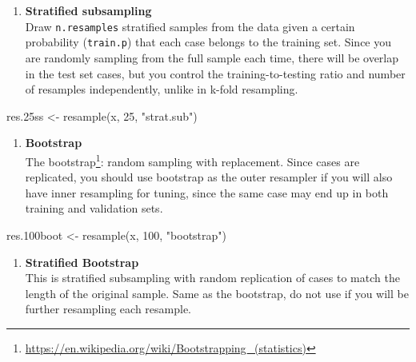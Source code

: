 \documentclass[
]{book}
\newenvironment{Shaded}{\begin{snugshade}}{\end{snugshade}}
\newcommand{\DecValTok}[1]{\textcolor[rgb]{0.00,0.00,0.81}{#1}}
\newcommand{\FloatTok}[1]{\textcolor[rgb]{0.00,0.00,0.81}{#1}}
\newcommand{\FunctionTok}[1]{\textcolor[rgb]{0.00,0.00,0.00}{#1}}
\newcommand{\NormalTok}[1]{#1}
\newcommand{\OtherTok}[1]{\textcolor[rgb]{0.56,0.35,0.01}{#1}}
\newcommand{\StringTok}[1]{\textcolor[rgb]{0.31,0.60,0.02}{#1}}
\DeclareRobustCommand{\href}[2]{#2\footnote{\url{#1}}}
\providecommand{\tightlist}{%
  \setlength{\itemsep}{0pt}\setlength{\parskip}{0pt}}
\renewcommand{\href}[2]{#2\footnote{\url{#1}}}
\begin{document}
\begin{enumerate}
\def\labelenumi{\arabic{enumi}.}
\setcounter{enumi}{1}
\tightlist
\item
  \textbf{Stratified subsampling}\\
  Draw \texttt{n.resamples} stratified samples from the data given a certain probability (\texttt{train.p}) that each case belongs to the training set. Since you are randomly sampling from the full sample each time, there will be overlap in the test set cases, but you control the training-to-testing ratio and number of resamples independently, unlike in k-fold resampling.
\end{enumerate}

\begin{Shaded}
\begin{Highlighting}[]
\NormalTok{res}\FloatTok{.25}\NormalTok{ss }\OtherTok{\textless{}{-}} \FunctionTok{resample}\NormalTok{(x, }\DecValTok{25}\NormalTok{, }\StringTok{"strat.sub"}\NormalTok{)}
\end{Highlighting}
\end{Shaded}

\begin{enumerate}
\def\labelenumi{\arabic{enumi}.}
\setcounter{enumi}{2}
\tightlist
\item
  \textbf{Bootstrap}\\
  The \href{https://en.wikipedia.org/wiki/Bootstrapping_(statistics)}{bootstrap}: random sampling with replacement. Since cases are replicated, you should use bootstrap as the outer resampler if you will also have inner resampling for tuning, since the same case may end up in both training and validation sets.
\end{enumerate}

\begin{Shaded}
\begin{Highlighting}[]
\NormalTok{res}\FloatTok{.100}\NormalTok{boot }\OtherTok{\textless{}{-}} \FunctionTok{resample}\NormalTok{(x, }\DecValTok{100}\NormalTok{, }\StringTok{"bootstrap"}\NormalTok{)}
\end{Highlighting}
\end{Shaded}

\begin{enumerate}
\def\labelenumi{\arabic{enumi}.}
\setcounter{enumi}{3}
\tightlist
\item
  \textbf{Stratified Bootstrap}\\
  This is stratified subsampling with random replication of cases to match the length of the original sample. Same as the bootstrap, do not use if you will be further resampling each resample.
\end{enumerate}
\end{document}
